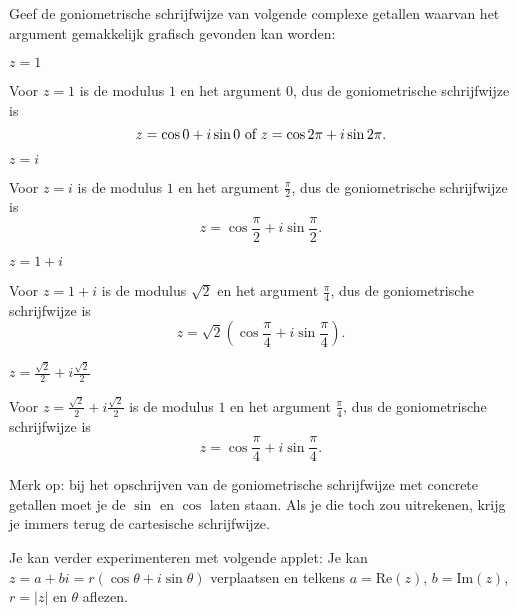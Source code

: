 \documentclass{ximera}
\begin{document}
\begin{exercise}\nl
    Geef de goniometrische schrijfwijze van volgende complexe getallen waarvan het argument gemakkelijk grafisch gevonden kan worden:
    \begin{question} $z=1 $
        \begin{oplossing}
          Voor $z=1 $ is de modulus $1$ en het argument $0$, dus de goniometrische schrijfwijze is $$z= \cos 0 + i\sin 0 \text{ of } z= \cos 2\pi + i\sin 2\pi.$$ 
        \end{oplossing}
    \end{question}
\begin{question} $z=i $
    \begin{oplossing}
     Voor $z=i $ is de modulus $1$ en het argument $\frac{\pi}{2}$, dus de goniometrische schrijfwijze is $$z= \cos\frac{\pi}{2} + i \sin \frac{\pi}{2}.$$   
    \end{oplossing}
\end{question}
    \begin{question} $z=1+i$
        \begin{oplossing}
            Voor $z=1+i$ is de modulus $\sqrt{2}$ en het argument $\frac{\pi}{4}$, dus de goniometrische schrijfwijze is $$z= \sqrt{2}(\cos \frac{\pi}{4}+i\sin\frac{\pi}{4}).$$  
        \end{oplossing}
    \end{question}
    \begin{question} $z=\frac{\sqrt2}{2}+i\frac{\sqrt2}{2}$
        \begin{oplossing}
            Voor $z=\frac{\sqrt2}{2}+i\frac{\sqrt2}{2}$ is de modulus $1$ en het argument $\frac{\pi}{4}$, dus de goniometrische schrijfwijze is $$z = \cos \frac{\pi}{4}+i\sin\frac{\pi}{4}.$$
        \end{oplossing}
    \end{question}
    
    Merk op: bij het opschrijven van de goniometrische schrijfwijze met concrete getallen moet je de $\sin$ en $\cos$ laten staan. Als je die toch zou uitrekenen, krijg je immers terug de cartesische schrijfwijze.
\end{exercise}


\begin{basicSkip}
Je kan verder experimenteren met volgende applet: Je kan $z= a+bi=r(\cos \theta+ i  \sin \theta)$ verplaatsen en telkens $a=\text{Re}(z)$, $b=\text{Im}(z)$, $r=|z|$ en $\theta$ aflezen.

\end{basicSkip}
\end{document}
